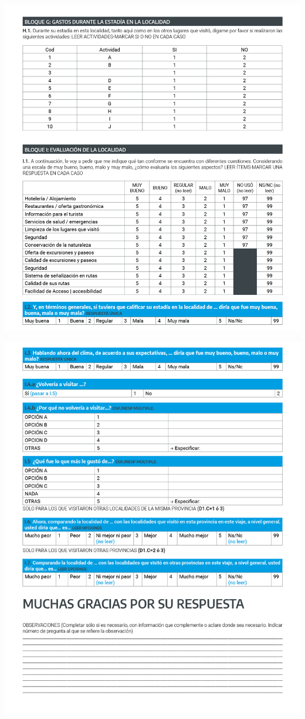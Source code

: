 \documentclass[
]{book}
\begin{document}
\begin{center}\includegraphics[width=1\linewidth]{imagenes/graf11} \end{center}

\begin{center}\includegraphics[width=1\linewidth]{imagenes/graf12} \end{center}

  
\end{document}
